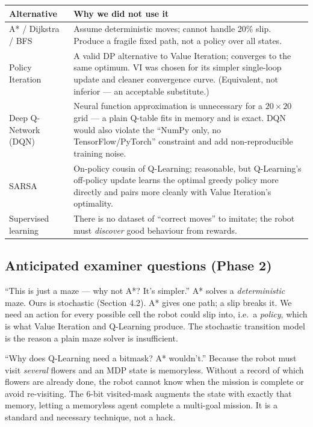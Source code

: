 \documentclass[11pt]{article}
\begin{document}
\begin{center}
\renewcommand{\arraystretch}{1.35}
\begin{tabular}{@{}p{3.6cm} p{9.4cm}@{}}
\toprule
\textbf{Alternative} & \textbf{Why we did not use it} \\
\midrule
A* / Dijkstra / BFS & Assume deterministic moves; cannot handle 20\% slip. Produce a fragile fixed path, not a policy over all states. \\
Policy Iteration & A valid DP alternative to Value Iteration; converges to the same optimum. VI was chosen for its simpler single-loop update and cleaner convergence curve. (Equivalent, not inferior --- an acceptable substitute.) \\
Deep Q-Network (DQN) & Neural function approximation is unnecessary for a $20\times20$ grid --- a plain Q-table fits in memory and is exact. DQN would also violate the ``NumPy only, no TensorFlow/PyTorch'' constraint and add non-reproducible training noise. \\
SARSA & On-policy cousin of Q-Learning; reasonable, but Q-Learning's off-policy update learns the optimal greedy policy more directly and pairs more cleanly with Value Iteration's optimality. \\
Supervised learning & There is no dataset of ``correct moves'' to imitate; the robot must \emph{discover} good behaviour from rewards. \\
\bottomrule
\end{tabular}
\end{center}

\subsection{Anticipated examiner questions (Phase 2)}

\begin{qbox}{``This is just a maze --- why not A*? It's simpler.''}
A* solves a \emph{deterministic} maze. Ours is stochastic (Section 4.2). A* gives
one path; a slip breaks it. We need an action for every possible cell the robot
could slip into, i.e.\ a \emph{policy}, which is what Value Iteration and
Q-Learning produce. The stochastic transition model is the reason a plain maze
solver is insufficient.
\end{qbox}

\begin{qbox}{``Why does Q-Learning need a bitmask? A* wouldn't.''}
Because the robot must visit \emph{several} flowers and an MDP state is
memoryless. Without a record of which flowers are already done, the robot cannot
know when the mission is complete or avoid re-visiting. The 6-bit visited-mask
augments the state with exactly that memory, letting a memoryless agent complete
a multi-goal mission. It is a standard and necessary technique, not a hack.
\end{qbox}
\end{document}
